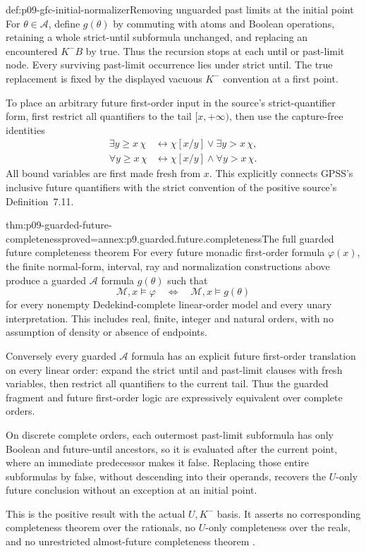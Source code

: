 \begin{hbdefinition}{def:p09-gfc-initial-normalizer}{Removing unguarded past limits at the initial point}
For \(\theta\in\mathcal A\), define \(g(\theta)\)
by commuting with atoms and Boolean operations,
retaining a whole strict-until subformula unchanged,
and replacing an encountered \(K^-B\) by true.
Thus the recursion stops at each until or past-limit
node. Every surviving past-limit occurrence lies
under strict until. The true replacement is fixed
by the displayed vacuous \(K^-\) convention at a
first point.

To place an arbitrary future first-order input in
the source's strict-quantifier form, first restrict
all quantifiers to the tail \([x,+\infty)\), then
use the capture-free identities
\[
\begin{aligned}
 \exists y\geq x\,\chi&\longleftrightarrow
                \chi[x/y]\lor\exists y>x\,\chi,\\
 \forall y\geq x\,\chi&\longleftrightarrow
                \chi[x/y]\land\forall y>x\,\chi.
\end{aligned}
\]
All bound variables are first made fresh from \(x\).
This explicitly connects GPSS's inclusive future
quantifiers with the strict convention of the
positive source's Definition~7.11.
\end{hbdefinition}

\begin{hbtheorem}{thm:p09-guarded-future-completeness}{proved=annex:p9.guarded.future.completeness}{The full guarded future completeness theorem}
For every future monadic first-order formula
\(\varphi(x)\), the finite normal-form, interval,
ray and normalization constructions above produce
a guarded \(\mathcal A\) formula \(g(\theta)\)
such that
\[
     \mathcal M,x\models\varphi
                 \quad\Longleftrightarrow\quad
     \mathcal M,x\models g(\theta)
\]
for every nonempty Dedekind-complete linear-order
model and every unary interpretation.
This includes real, finite, integer and natural
orders, with no assumption of density or absence
of endpoints.

Conversely every guarded \(\mathcal A\) formula
has an explicit future first-order translation
on every linear order: expand the strict until
and past-limit clauses with fresh variables,
then restrict all quantifiers to the current
tail. Thus the guarded fragment and future
first-order logic are expressively equivalent
over complete orders.

On discrete complete orders, each outermost past-limit
subformula has only Boolean and future-until ancestors,
so it is evaluated after the current point, where an
immediate predecessor makes it false. Replacing those
entire subformulas by false, without descending into
their operands, recovers the \(U\)-only future conclusion
without an exception at an initial point.

This is the positive result with the actual
\(U,K^-\) basis. It asserts no corresponding
completeness theorem over the rationals, no
\(U\)-only completeness over the reals, and no
unrestricted almost-future completeness theorem
\cite[Theorem~7.4, pp.~13--15]{Rabinovich2014Kamp}.
\end{hbtheorem}

